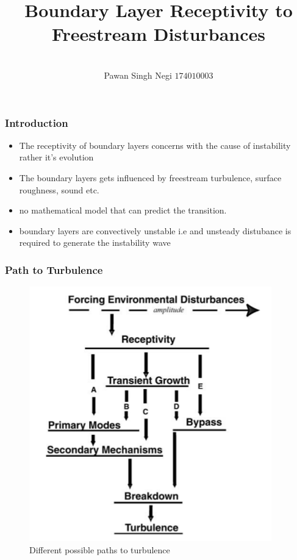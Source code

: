 \documentclass[aspectratio=149]{beamer}
\title{Boundary Layer Receptivity to Freestream Disturbances}
\author[pawan]{\texorpdfstring{\\}{}
    Pawan Singh Negi \- \texorpdfstring{$174010003$}{}  \texorpdfstring{\\}{}
}
\institute[IITB]{Indian Institute of Technology, Bombay}
\begin{document}
\monthyeardate{}
\maketitle


\begin{frame}
    \frametitle{Introduction}
    \begin{itemize}
        \item The receptivity of boundary layers concerns with the cause of
          instability rather it's evolution
        \item The boundary layers gets influenced by freestream turbulence,
          surface roughness, sound etc.
        \item no mathematical model that can predict the transition.
        \item boundary layers are convectively unstable i.e and unsteady
          distubance is required to generate the instability wave
    \end{itemize}
\end{frame}

\begin{frame}
    \frametitle{Path to Turbulence}
    \begin{figure}[h!]
      \centering
      \includegraphics[scale=0.4]{path.png}
      \caption{Different possible paths to turbulence}
      \label{fig:path}
    \end{figure}
\end{frame}
\end{document}
